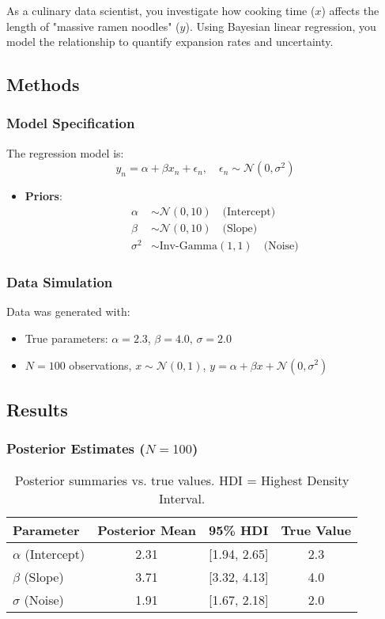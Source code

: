As a culinary data scientist, you investigate how cooking time (\(x\)) affects the length of "massive ramen noodles" (\(y\)). Using Bayesian linear regression, you model the relationship to quantify expansion rates and uncertainty.

\subsection*{Methods}
\subsubsection*{Model Specification}
The regression model is:
\[
y_n = \alpha + \beta x_n + \epsilon_n, \quad \epsilon_n \sim \mathcal{N}(0, \sigma^2)
\]
\begin{itemize}
    \item \textbf{Priors}: 
    \begin{align*}
        \alpha &\sim \mathcal{N}(0, 10) \quad \text{(Intercept)} \\
        \beta &\sim \mathcal{N}(0, 10) \quad \text{(Slope)} \\
        \sigma^2 &\sim \text{Inv-Gamma}(1, 1) \quad \text{(Noise)}
    \end{align*}
\end{itemize}

\subsubsection*{Data Simulation}
Data was generated with:
\begin{itemize}
    \item True parameters: \(\alpha = 2.3\), \(\beta = 4.0\), \(\sigma = 2.0\)
    \item \(N = 100\) observations, \(x \sim \mathcal{N}(0, 1)\), \(y = \alpha + \beta x + \mathcal{N}(0, \sigma^2)\)
\end{itemize}

\subsection*{Results}
\subsubsection*{Posterior Estimates (\(N = 100\))}
\begin{table}[h]
    \centering
    \begin{tabular}{@{}lccc@{}}
        \toprule
        Parameter & Posterior Mean & 95\% HDI & True Value \\
        \midrule
        \(\alpha\) (Intercept) & 2.31 & [1.94, 2.65] & 2.3 \\
        \(\beta\) (Slope) & 3.71 & [3.32, 4.13] & 4.0 \\
        \(\sigma\) (Noise) & 1.91 & [1.67, 2.18] & 2.0 \\
        \bottomrule
    \end{tabular}
    \caption{Posterior summaries vs. true values. HDI = Highest Density Interval.}
\end{table}

